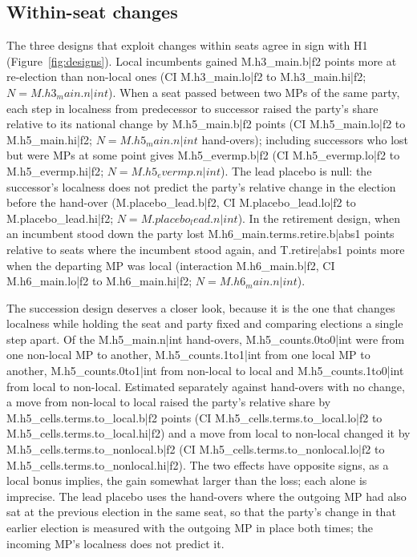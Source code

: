 \documentclass[11pt,a4paper]{article}
\begin{document}
\subsection{Within-seat changes}
The three designs that exploit changes within seats agree in sign with H1 (Figure~\ref{fig:designs}). Local incumbents gained {{M.h3_main.b|f2}} points more at re-election than non-local ones (CI {{M.h3_main.lo|f2}} to {{M.h3_main.hi|f2}}; $N={{M.h3_main.n|int}}$). When a seat passed between two MPs of the same party, each step in localness from predecessor to successor raised the party's share relative to its national change by {{M.h5_main.b|f2}} points (CI {{M.h5_main.lo|f2}} to {{M.h5_main.hi|f2}}; $N={{M.h5_main.n|int}}$ hand-overs); including successors who lost but were MPs at some point gives {{M.h5_evermp.b|f2}} (CI {{M.h5_evermp.lo|f2}} to {{M.h5_evermp.hi|f2}}; $N={{M.h5_evermp.n|int}}$). The lead placebo is null: the successor's localness does not predict the party's relative change in the election before the hand-over ({{M.placebo_lead.b|f2}}, CI {{M.placebo_lead.lo|f2}} to {{M.placebo_lead.hi|f2}}; $N={{M.placebo_lead.n|int}}$). In the retirement design, when an incumbent stood down the party lost {{M.h6_main.terms.retire.b|abs1}} points relative to seats where the incumbent stood again, and {{T.retire|abs1}} points more when the departing MP was local (interaction {{M.h6_main.b|f2}}, CI {{M.h6_main.lo|f2}} to {{M.h6_main.hi|f2}}; $N={{M.h6_main.n|int}}$).

The succession design deserves a closer look, because it is the one that changes localness while holding the seat and party fixed and comparing elections a single step apart. Of the {{M.h5_main.n|int}} hand-overs, {{M.h5_counts.0to0|int}} were from one non-local MP to another, {{M.h5_counts.1to1|int}} from one local MP to another, {{M.h5_counts.0to1|int}} from non-local to local and {{M.h5_counts.1to0|int}} from local to non-local. Estimated separately against hand-overs with no change, a move from non-local to local raised the party's relative share by {{M.h5_cells.terms.to_local.b|f2}} points (CI {{M.h5_cells.terms.to_local.lo|f2}} to {{M.h5_cells.terms.to_local.hi|f2}}) and a move from local to non-local changed it by {{M.h5_cells.terms.to_nonlocal.b|f2}} (CI {{M.h5_cells.terms.to_nonlocal.lo|f2}} to {{M.h5_cells.terms.to_nonlocal.hi|f2}}). The two effects have opposite signs, as a local bonus implies, the gain somewhat larger than the loss; each alone is imprecise. The lead placebo uses the hand-overs where the outgoing MP had also sat at the previous election in the same seat, so that the party's change in that earlier election is measured with the outgoing MP in place both times; the incoming MP's localness does not predict it.
\end{document}
